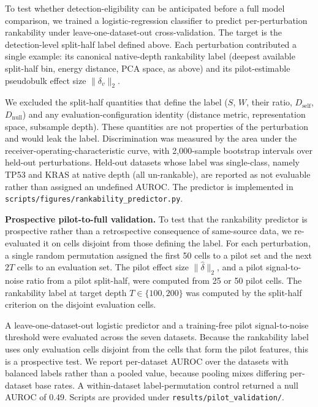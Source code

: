\documentclass[11pt,letterpaper]{article}
\begin{document}
To test whether detection-eligibility can be anticipated before a full model comparison, we trained a logistic-regression classifier to predict per-perturbation rankability under leave-one-dataset-out cross-validation. The target is the detection-level split-half label defined above. Each perturbation contributed a single example: its canonical native-depth rankability label (deepest available split-half bin, energy distance, PCA space, as above) and its pilot-estimable pseudobulk effect size $\lVert \delta_v\rVert_2$.

We excluded the split-half quantities that define the label ($S$, $W$, their ratio, $D_{\mathrm{self}}$, $D_{\mathrm{null}}$) and any evaluation-configuration identity (distance metric, representation space, subsample depth). These quantities are not properties of the perturbation and would leak the label. Discrimination was measured by the area under the receiver-operating-characteristic curve, with 2{,}000-sample bootstrap intervals over held-out perturbations. Held-out datasets whose label was single-class, namely TP53 and KRAS at native depth (all un-rankable), are reported as not evaluable rather than assigned an undefined AUROC. The predictor is implemented in \texttt{scripts/figures/rankability\_predictor.py}.

\textbf{Prospective pilot-to-full validation.} To test that the rankability predictor is prospective rather than a retrospective consequence of same-source data, we re-evaluated it on cells disjoint from those defining the label. For each perturbation, a single random permutation assigned the first 50 cells to a pilot set and the next $2T$ cells to an evaluation set. The pilot effect size $\lVert\hat{\delta}\rVert_2$, and a pilot signal-to-noise ratio from a pilot split-half, were computed from 25 or 50 pilot cells. The rankability label at target depth $T \in \{100, 200\}$ was computed by the split-half criterion on the disjoint evaluation cells.

A leave-one-dataset-out logistic predictor and a training-free pilot signal-to-noise threshold were evaluated across the seven datasets. Because the rankability label uses only evaluation cells disjoint from the cells that form the pilot features, this is a prospective test. We report per-dataset AUROC over the datasets with balanced labels rather than a pooled value, because pooling mixes differing per-dataset base rates. A within-dataset label-permutation control returned a null AUROC of 0.49. Scripts are provided under \texttt{results/pilot\_validation/}.
\end{document}

